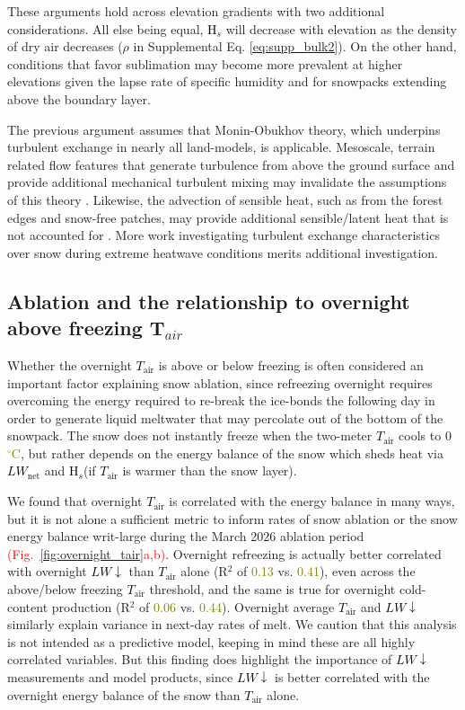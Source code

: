 \documentclass[draft]{agujournal2019}
\newcommand{\fig}[2]{\textcolor{red}{(Fig.~\ref{#1}{#2})}}   %
\newcommand{\mynum}[1]{\textcolor{olive}{#1}}
\newcommand{\tair}{\textcolor{black}{$T_{\mathrm{air}}$}\xspace}
\newcommand{\lwnet}{\textcolor{black}{$LW_{\mathrm{net}}$}\xspace}
\newcommand{\lwdn}{\textcolor{black}{$LW\downarrow$}\xspace}
\newcommand{\hs}{\textcolor{black}{H$_s$}\xspace}
\newcommand{\degrc}{\textcolor{olive}{$^\circ$C}\xspace}
\begin{document}
These arguments hold across elevation gradients with two additional considerations.
All else being equal, \hs will decrease with elevation as the density of dry air decreases ($\rho$ in Supplemental Eq. \ref{eq:supp_bulk2}).
On the other hand, conditions that favor sublimation may become more prevalent at higher elevations given the lapse rate of specific humidity and for snowpacks extending above the boundary layer.


The previous argument assumes that Monin-Obukhov theory, which underpins turbulent exchange in nearly all land-models, is applicable.
Mesoscale, terrain related flow features that generate turbulence from above the ground surface and provide additional mechanical turbulent mixing may invalidate the assumptions of this theory \cite{Schwat2025-ur}. 
Likewise, the advection of sensible heat, such as from the forest edges and snow-free patches, may provide additional sensible/latent heat that is not accounted for \cite{Harder2017-zo}.
More work investigating turbulent exchange characteristics over snow during extreme heatwave conditions merits additional investigation. 

\subsection{Ablation and the relationship to overnight above freezing T$_{air}$} 
Whether the overnight \tair is above or below freezing is often considered an important factor explaining snow ablation, since refreezing overnight requires overcoming the energy required to re-break the ice-bonds the following day in order to generate liquid meltwater that may percolate out of the bottom of the snowpack.
The snow does not instantly freeze when the two-meter \tair cools to 0 \degrc, but rather depends on the energy balance of the snow which sheds heat via \lwnet and \hs (if \tair is warmer than the snow layer).

We found that overnight \tair is correlated with the energy balance in many ways, but it is not alone a sufficient metric to inform rates of snow ablation or the snow energy balance writ-large during the March 2026 ablation period \fig{fig:overnight_tair}{a,b}.
Overnight refreezing is actually better correlated with overnight \lwdn than \tair alone (R$^2$ of \mynum{0.13} vs. \mynum{0.41}), even across the above/below freezing \tair threshold, and the same is true for overnight cold-content production (R$^2$ of \mynum{0.06} vs. \mynum{0.44}). 
Overnight average \tair and \lwdn similarly explain variance in next-day rates of melt.
We caution that this analysis is not intended as a predictive model, keeping in mind these are all highly correlated variables.
But this finding does highlight the importance of \lwdn measurements and model products, since \lwdn is better correlated with the overnight energy balance of the snow than \tair alone.
\end{document}
